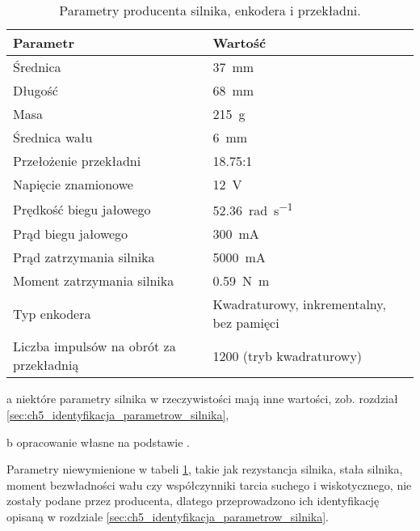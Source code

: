 \begin{table}[H]
    \centering
    \begin{threeparttable}
        \caption{Parametry producenta silnika, enkodera i przekładni.}
        \label{tab:parametry_silnika}
        
        \begin{tabularx}{0.9\textwidth}{l | l}
            \toprule
            Parametr & Wartość \\
            \midrule
            Średnica & \SI{37}{\milli\meter} \\
            Długość & \SI{68}{\milli\meter} \\
            Masa & \SI{215}{g} \\
            Średnica wału & \SI{6}{\milli\meter} \\
            \midrule
            Przełożenie przekładni & \num{18,75}:\num{1} \\
            \midrule
            Napięcie znamionowe & \SI{12}{\volt} \\
            Prędkość biegu jałowego & \SI{52,36}{\radian\per\second} \\
            Prąd biegu jałowego & \SI{300}{\milli\ampere} \\
            Prąd zatrzymania silnika & \SI{5000}{\milli\ampere} \\
            Moment zatrzymania silnika & \SI{0,59}{\newton\meter} \\
            \midrule
            Typ enkodera & Kwadraturowy, inkrementalny, bez pamięci \\
            Liczba impulsów na obrót za przekładnią & \num{1200} (tryb kwadraturowy) \\
            \bottomrule
        \end{tabularx}
        
        \begin{tablenotes}
            \footnotesize
            \item[a] niektóre parametry silnika w rzeczywistości mają inne wartości, zob. rozdział \ref{sec:ch5_identyfikacja_parametrow_silnika},
            \item[b] opracowanie własne na podstawie \cite{SILNIK_MANUAL}.
        \end{tablenotes}
    \end{threeparttable}
\end{table}

Parametry niewymienione w tabeli \ref{tab:parametry_silnika}, takie jak rezystancja silnika, stała silnika, moment bezwładności wału czy współczynniki tarcia suchego i wiskotycznego, nie zostały podane przez producenta, dlatego przeprowadzono ich identyfikację opisaną w rozdziale \ref{sec:ch5_identyfikacja_parametrow_silnika}.


